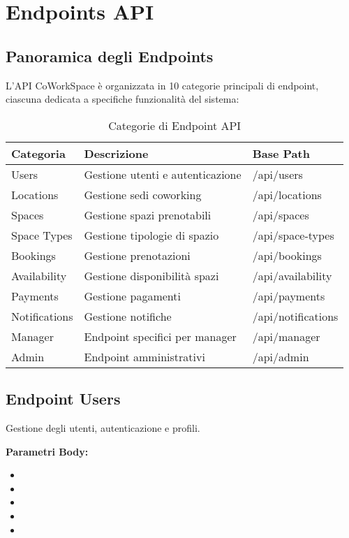 \section{Endpoints API}

\subsection{Panoramica degli Endpoints}
L'API CoWorkSpace è organizzata in 10 categorie principali di endpoint, ciascuna dedicata a specifiche funzionalità del sistema:

\begin{table}[H]
\centering
\begin{tabular}{@{}lp{8cm}l@{}}
\toprule
\textbf{Categoria} & \textbf{Descrizione} & \textbf{Base Path} \\
\midrule
Users & Gestione utenti e autenticazione & /api/users \\
Locations & Gestione sedi coworking & /api/locations \\
Spaces & Gestione spazi prenotabili & /api/spaces \\
Space Types & Gestione tipologie di spazio & /api/space-types \\
Bookings & Gestione prenotazioni & /api/bookings \\
Availability & Gestione disponibilità spazi & /api/availability \\
Payments & Gestione pagamenti & /api/payments \\
Notifications & Gestione notifiche & /api/notifications \\
Manager & Endpoint specifici per manager & /api/manager \\
Admin & Endpoint amministrativi & /api/admin \\
\bottomrule
\end{tabular}
\caption{Categorie di Endpoint API}
\end{table}

\newpage

\subsection{Endpoint Users}
Gestione degli utenti, autenticazione e profili.


\textbf{Parametri Body:}
\begin{itemize}
    \item {}
    \item {}
    \item {}
    \item {}
    \item {}
\end{itemize}

